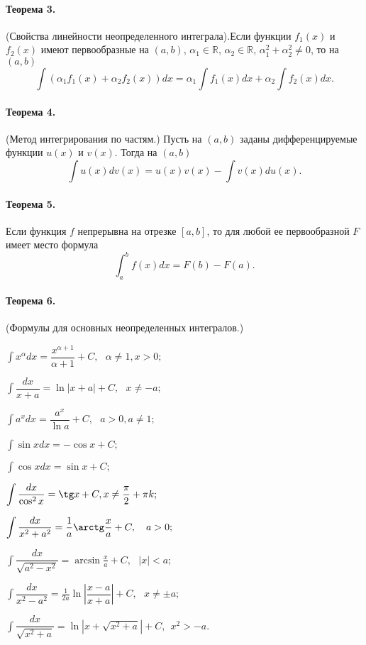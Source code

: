 \documentclass[a4paper,12pt]{article} %
\newcommand{\abs}[1]{\left|#1\right|}
\begin{document}
\paragraph{Теорема 3.} (Свойства линейности неопределенного
интеграла).Если функции $ f_1(x) $ и $ f_2(x) $ имеют
первообразные на $ (a, b) $, $ \alpha_1\in\mathbb{R} $, 
$ \alpha_2\in\mathbb{R} $, $ \alpha_1^2+\alpha_2^2\ne0 $, 
то на $ (a, b) $
\begin{equation}
	\int(\alpha_1f_1(x)+\alpha_2f_2(x))dx=
	\alpha_1\int f_1(x)dx+\alpha_2\int f_2(x)dx.
\end{equation}
\paragraph{Теорема 4.}(Метод интегрирования по частям.)
Пусть на $ (a, b) $ заданы дифференцируемые функции 
$ u(x) $ и $ v(x) $. Тогда на $ (a, b) $
\begin{equation}
	\int u(x)dv(x)=u(x)v(x)-\int v(x)du(x).
\end{equation}
\paragraph{Теорема 5.} Если функция $ f $ непрерывна на отрезке
$ [a, b] $, то для любой ее первообразной $ F $ имеет место формула
\begin{equation}
	\int_{a}^{b}f(x)dx=F(b)-F(a).
\end{equation}
\paragraph{Теорема 6.}(Формулы для основных неопределенных
интегралов.)
\begin{enumerate}
\begin{multicols}{2}
		\item $ \displaystyle\int x^{\alpha}dx=
		\dfrac{x^{\alpha+1}}{\alpha+1}+C, ~~~ \alpha\ne1, x>0;$
		\item $ \displaystyle\int\dfrac{dx}{x+a}=
		\ln\abs{x+a}+C, ~~~ x\ne -a; $
		\item $ \displaystyle\int a^xdx=
		\dfrac{a^x}{\ln a}+C, ~~~ a>0, a\ne1; $
		\item $ \displaystyle\int\sin xdx=-\cos x+C; $
		\item $ \displaystyle\int\cos xdx=\sin x+C; $
		\item $ \displaystyle\int\dfrac{dx}{\cos^2x}=
		\tg x+C, x\ne\frac{\pi}{2}+\pi k; $
		\item $ \displaystyle\int\dfrac{dx}{x^2+a^2}=
		\frac{1}{a}\arctg\frac{x}{a}+C, ~~~ a>0; $
		\item $  \displaystyle\int\dfrac{dx}{\sqrt{a^2-x^2}}=
		\arcsin \frac{x}{a}+C, ~~~ \abs{x}<a;$
		\item $  \displaystyle\int\dfrac{dx}{x^2-a^2}=
		\frac{1}{2a}\ln\abs{\dfrac{x-a}{x+a}}+C,~~~x\ne\pm a;$
		\item 
		$  \displaystyle\int\dfrac{dx}{\sqrt{x^2+a}}=
		\ln\abs{x+\sqrt{x^2+a}}+C,~~x^2>-a. $
\end{multicols}
\end{enumerate}
\end{document}

